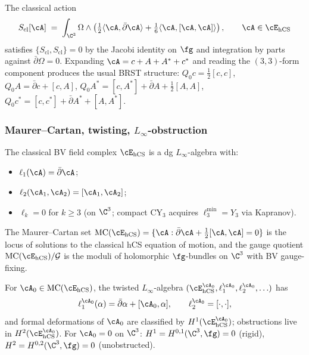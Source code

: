 \begin{proposition}
\label{prop:classical-ME-avatar}
The classical action
\[
S_{\mathrm{cl}}[\cA] \;=\; \int_{\C^3} \Omega \wedge \left( \tfrac{1}{2} \langle \cA, \bar\partial \cA \rangle + \tfrac{1}{6} \langle \cA, [\cA, \cA] \rangle \right), \qquad \cA \in \cE_{\hCS}
\]
satisfies $\{S_{\mathrm{cl}}, S_{\mathrm{cl}}\} = 0$ by the Jacobi identity on $\fg$ and integration by parts against $\bar\partial\Omega = 0$. Expanding $\cA = c + A + A^* + c^*$ and reading the $(3,3)$-form component produces the usual BRST structure: $Q_0 c = \tfrac{1}{2}[c,c]$, $Q_0 A = \bar\partial c + [c, A]$, $Q_0 A^* = [c, A^*] + \bar\partial A + \tfrac{1}{2}[A, A]$, $Q_0 c^* = [c, c^*] + \bar\partial A^* + [A, A^*]$.
\end{proposition}

\subsubsection{Maurer--Cartan, twisting, $L_\infty$-obstruction}
\label{sssec:MC-twisting-Linf}

\begin{proposition}[Maurer--Cartan = flat hCS]
\label{prop:MC-flat-hCS-avatar}
The classical BV field complex $\cE_{\hCS}$ is a dg $L_\infty$-algebra with:
\begin{itemize}
\item $\ell_1(\cA) = \bar\partial \cA$;
\item $\ell_2(\cA_1, \cA_2) = [\cA_1, \cA_2]$;
\item $\ell_k = 0$ for $k \geq 3$ (on $\C^3$; compact CY$_3$ acquires $\ell_3^{\min} = Y_3$ via Kapranov).
\end{itemize}
The Maurer--Cartan set
$\mathrm{MC}(\cE_{\hCS}) = \{\cA : \bar\partial \cA + \tfrac{1}{2}[\cA, \cA] = 0\}$
is the locus of solutions to the classical hCS equation of motion, and the gauge quotient
$\mathrm{MC}(\cE_{\hCS}) / \mathcal{G}$ is the moduli of holomorphic $\fg$-bundles on $\C^3$ with BV gauge-fixing.
\end{proposition}

\begin{proposition}
\label{prop:twisting-hCS-avatar}
For $\cA_0 \in \mathrm{MC}(\cE_{\hCS})$, the twisted $L_\infty$-algebra $(\cE_{\hCS}^{\cA_0}, \ell_1^{\cA_0}, \ell_2^{\cA_0}, \ldots)$ has
\[
\ell_1^{\cA_0}(\alpha) = \bar\partial \alpha + [\cA_0, \alpha], \qquad \ell_2^{\cA_0} = [\cdot, \cdot],
\]
and formal deformations of $\cA_0$ are classified by $H^1(\cE_{\hCS}^{\cA_0})$; obstructions live in $H^2(\cE_{\hCS}^{\cA_0})$. For $\cA_0 = 0$ on $\C^3$: $H^1 = H^{0,1}(\C^3, \fg) = 0$ (rigid), $H^2 = H^{0,2}(\C^3, \fg) = 0$ (unobstructed).
\end{proposition}

